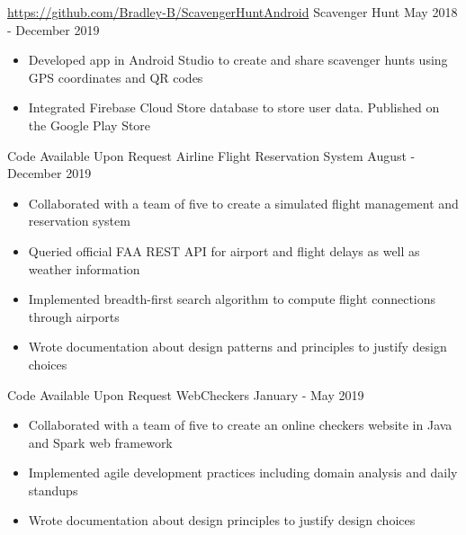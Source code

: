 \documentclass{awesome-cv}
\begin{document}
		\begin{cventries}
			\cventry
				{\href{https://github.com/Bradley-B/ScavengerHuntAndroid}{https://github.com/Bradley-B/ScavengerHuntAndroid}}
				{Scavenger Hunt\small{\textnormal{\color{graytext}{, Personal Project}}}}
				{May 2018 - December 2019}
				{}
				{
					\vspace{-0.25cm}
					\begin{itemize}[nosep]
						\item Developed app in Android Studio to create and share scavenger hunts using GPS coordinates and QR codes 
						\item Integrated Firebase Cloud Store database to store user data. Published on the Google Play Store
					\end{itemize}
					\vspace{-0.5cm}
				}

			\cventry
				{Code Available Upon Request}
				{Airline Flight Reservation System\small{\textnormal{\color{graytext}{, Engineering of Software Subsystems}}}}
				{August - December 2019}
				{}
				{
					\vspace{-0.25cm}
					\begin{itemize}[nosep]
						\item Collaborated with a team of five to create a simulated flight management and reservation system
						\item Queried official FAA REST API for airport and flight delays as well as weather information
						\item Implemented breadth-first search algorithm to compute flight connections through airports
						\item Wrote documentation about design patterns and principles to justify design choices
					\end{itemize}
					\vspace{-0.5cm}
				}

			\cventry
				{Code Available Upon Request}
				{WebCheckers\small{\textnormal{\color{graytext}{, Introduction to Software Engineering}}}}
				{January - May 2019}
				{}
				{
					\vspace{-0.25cm}
					\begin{itemize}[nosep]
						\item Collaborated with a team of five to create an online checkers website in Java and Spark web framework
						\item Implemented agile development practices including domain analysis and daily standups
						\item Wrote documentation about design principles to justify design choices
					\end{itemize}
					\vspace{-0.5cm}
				}


\end{cventries}
\end{document}
